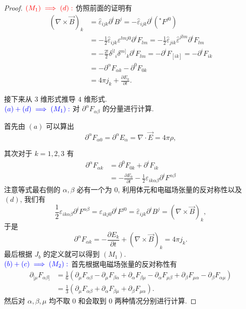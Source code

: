 \begin{proof}
    $\textcolor{red}{(M_1)\implies(d):}$ 仿照前面的证明有\vspace{1.5ex}
    \begin{align*}
        (\nabla\times\vec{B})_k&=\hat{\varepsilon}_{ijk}\partial^iB^j=-\hat{\varepsilon}_{ijk}\partial^i({}^{*}\!F^{j0})\\
        &=-\frac{1}{2}\hat{\varepsilon}_{ijk}\varepsilon^{lmj0}\partial^iF_{lm}=-\frac{1}{2}\hat{\varepsilon}_{jik}\hat{\varepsilon}^{jlm}\partial^iF_{lm}\\
        &=-\frac{2!}{2}\delta^{[l}{}_{i}\delta^{m]}{}_{k}\partial^i F_{lm}=-\partial^iF_{[ik]}=-\partial^i F_{ik}\\
        &=-\partial^\alpha F_{\alpha k}-\partial^0F_{0k}\\
        &=4\pi j_k+\frac{\partial E_k}{\partial t}.
    \end{align*}

    接下来从 $3$ 维形式推导 $4$ 维形式.\\
    $\textcolor{blue}{(a)+(d)\implies(M_1):}$ 对 $\partial^\alpha F_{\alpha\beta}$ 的分量进行计算.

    首先由 $(a)$ 可以算出
    \[ \partial^\alpha F_{\alpha0}=\partial^\alpha E_\alpha=\nabla\cdot\vec{E}=4\pi\rho, \]

    其次对于 $k=1,2,3$ 有
    \begin{align*}
        \partial^\alpha F_{\alpha k}&=\partial^0F_{0k}+\partial^iF_{ik}\\
        &=-\frac{\partial E_k}{\partial t}-\frac{1}{2}\varepsilon_{ik\alpha\beta}\partial^iF^{\alpha\beta}
    \end{align*}
    注意等式最右侧的 $\alpha,\beta$ 必有一个为 $0$, 利用体元和电磁场张量的反对称性以及 $(d)$, 我们有
    \[ \frac{1}{2}\varepsilon_{ik\alpha\beta}\partial^iF^{\alpha\beta}=\varepsilon_{ikj0}\partial^iF^{j0}=\hat{\varepsilon}_{ijk}\partial^iB^j=(\nabla\times \vec{B})_k, \]
    于是
    \[\partial^\alpha F_{\alpha k}=-\frac{\partial E_k}{\partial t}+(\nabla\times\vec{B})_k=4\pi j_k.\]
    最后根据 $J_b$ 的定义就可以得到 $(M_1)$.\\
    $\textcolor{blue}{(b)+(c)\implies(M_2):}$ 首先根据电磁场张量的反对称性有
    \begin{align*}
        \partial_{[\mu}F_{\alpha\beta]} &=\frac{1}{6}\left( \partial_\mu F_{\alpha\beta}-\partial_\mu F_{\beta\alpha} +\partial_\alpha F_{\beta\mu}-\partial_\alpha F_{\mu\beta}+\partial_\beta F_{\mu\alpha}-\partial_\beta F_{\alpha\mu}\right)\\
        &=\frac{1}{3}\left( \partial_\mu F_{\alpha\beta} +\partial_\alpha F_{\beta\mu}+\partial_\beta F_{\mu\alpha}\right).
    \end{align*}
    然后对 $\alpha, \beta, \mu$ 均不取 $0$ 和会取到 $0$ 两种情况分别进行计算.


\end{proof}
